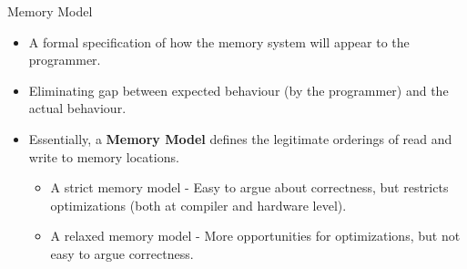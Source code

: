 \documentclass[9pt]{beamer}
\begin{document}
\begin{frame}{Memory Model}
\begin{itemize}
\item A formal specification of how the memory system will appear to the programmer.
\item Eliminating gap between expected behaviour (by the programmer) and the
      actual behaviour.
\item Essentially, a \textbf{Memory Model} defines the legitimate orderings of read and write
      to memory locations.
\pause
  \begin{itemize}
  \item A strict memory model - Easy to argue about correctness, but restricts
        optimizations (both at compiler and hardware level).
  \item A relaxed memory model - More opportunities for optimizations, but not
        easy to argue correctness.
  \end{itemize}
\end{itemize}
\end{frame}
\end{document}

